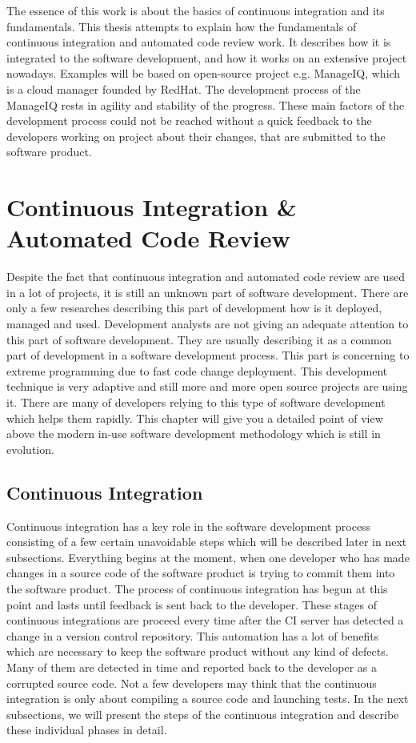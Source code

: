 The essence of this work is about the basics of continuous integration and its fundamentals. This thesis attempts to explain how the fundamentals of continuous integration and automated code review work. It describes how it is integrated to the software development, and how it works on an extensive project nowadays. Examples will be based on open-source project e.g. ManageIQ, which is a cloud manager founded by RedHat. The development process of the ManageIQ rests in agility and stability of the progress. These main factors of the development process could not be reached without a quick feedback to the developers working on project about their changes, that are submitted to the software product.

\chapter{Continuous Integration \& Automated Code Review}

Despite the fact that continuous integration and automated code review are used in a lot of projects, it is still an unknown part of software development. There are only a few researches describing this part of development how is it deployed, managed and used. Development analysts are not giving an adequate attention to this part of software development. They are usually describing it as a common part of development in a software development process. This part is concerning to extreme programming due to fast code change deployment. This development technique is very adaptive and still more and more open source projects are using it. There are many of developers relying to this type of software development which helps them rapidly. This chapter will give you a detailed point of view above the modern in-use software development methodology which is still in evolution.

\section{Continuous Integration}
Continuous integration has a key role in the software development process consisting of a few certain unavoidable steps which will be described later in next subsections. Everything begins at the moment, when one developer who has made changes in a source code of the software product is trying to commit them into the software product. The process of continuous integration has begun at this point and lasts until feedback is sent back to the developer. These stages of continuous integrations are proceed every time after the CI server has detected a change in a version control repository. This automation has a lot of benefits which are necessary to keep the software product without any kind of defects. Many of them are detected in time and reported back to the developer as a corrupted source code. Not a few developers may think that the continuous integration is only about compiling a source code and launching tests. In the next subsections, we will present the steps of the continuous integration and describe these individual phases in detail.\\

